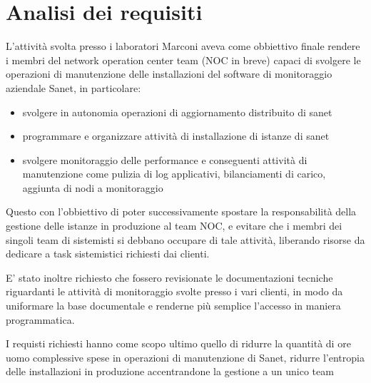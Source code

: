 \chapter{Analisi dei requisiti}

L'attività svolta presso i laboratori Marconi aveva come obbiettivo finale rendere i membri del network operation center team (NOC in breve) capaci di svolgere le operazioni di manutenzione delle installazioni del software di monitoraggio aziendale Sanet, in particolare:

\begin{itemize}
\item svolgere in autonomia operazioni di aggiornamento distribuito di sanet
\item programmare e organizzare attività di installazione di istanze di sanet
\item svolgere monitoraggio delle performance e conseguenti attività di manutenzione come pulizia di log applicativi, bilanciamenti di carico, aggiunta di nodi a monitoraggio
\end{itemize}

Questo con l'obbiettivo di poter successivamente spostare la responsabilità della gestione delle istanze in produzione al team NOC, e evitare che i membri dei singoli team di sistemisti si debbano occupare di tale attività, liberando risorse da dedicare a task sistemistici richiesti dai clienti.

E' stato inoltre richiesto che fossero revisionate le documentazioni tecniche riguardanti le attività di monitoraggio svolte presso i vari clienti, in modo da uniformare la base documentale e renderne più semplice l'accesso in maniera programmatica.

I requisti richiesti hanno come scopo ultimo quello di ridurre la quantità di ore uomo complessive spese in operazioni di manutenzione di Sanet, ridurre l'entropia delle installazioni in produzione accentrandone la gestione a un unico team

